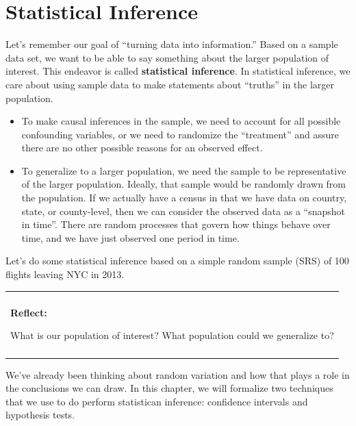 \documentclass[]{book}
\newenvironment{Shaded}{\begin{snugshade}}{\end{snugshade}}
\newcommand{\CommentTok}[1]{\textcolor[rgb]{0.56,0.35,0.01}{\textit{#1}}}
\newcommand{\DataTypeTok}[1]{\textcolor[rgb]{0.13,0.29,0.53}{#1}}
\newcommand{\DecValTok}[1]{\textcolor[rgb]{0.00,0.00,0.81}{#1}}
\newcommand{\KeywordTok}[1]{\textcolor[rgb]{0.13,0.29,0.53}{\textbf{#1}}}
\newcommand{\NormalTok}[1]{#1}
\newcommand{\OperatorTok}[1]{\textcolor[rgb]{0.81,0.36,0.00}{\textbf{#1}}}
\newcommand{\StringTok}[1]{\textcolor[rgb]{0.31,0.60,0.02}{#1}}
\providecommand{\tightlist}{%
  \setlength{\itemsep}{0pt}\setlength{\parskip}{0pt}}
\newenvironment{reflect}
{
    \begin{center}
    
    \begin{tabular}{|p{0.8\textwidth}|}
    \rowcolor{LightBlue}
    \hline\\
    \rowcolor{LightBlue}
    \textbf{Reflect:}
}
{
    \\\rowcolor{LightBlue}
    \\\hline
    \end{tabular} 
    \end{center}
}
\begin{document}
\hypertarget{statistical-inference}{%
\chapter{Statistical Inference}\label{statistical-inference}}

Let's remember our goal of ``turning data into information.'' Based on a sample data set, we want to be able to say something about the larger population of interest. This endeavor is called \textbf{statistical inference}. In statistical inference, we care about using sample data to make statements about ``truths'' in the larger population.

\begin{itemize}
\tightlist
\item
  To make causal inferences in the sample, we need to account for all possible confounding variables, or we need to randomize the ``treatment'' and assure there are no other possible reasons for an observed effect.
\item
  To generalize to a larger population, we need the sample to be representative of the larger population. Ideally, that sample would be randomly drawn from the population. If we actually have a census in that we have data on country, state, or county-level, then we can consider the observed data as a ``snapshot in time''. There are random processes that govern how things behave over time, and we have just observed one period in time.
\end{itemize}

Let's do some statistical inference based on a simple random sample (SRS) of 100 flights leaving NYC in 2013.

\begin{reflect}
What is our population of interest? What population could we generalize
to?
\end{reflect}

\begin{Shaded}
\end{Shaded}

We've already been thinking about random variation and how that plays a role in the conclusions we can draw. In this chapter, we will formalize two techniques that we use to do perform statistican inference: confidence intervals and hypothesis tests.
\end{document}
